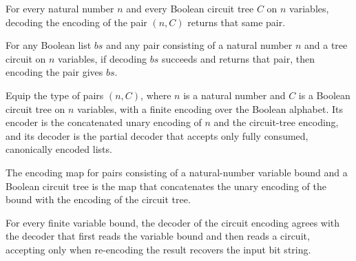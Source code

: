 \begin{theorem}
\label{BoolCircuit.decodeSigma_encodeSigma}
\leanok
{}
For every natural number $n$ and every Boolean circuit tree $C$ on $n$ variables,
decoding the encoding of the pair $(n,C)$ returns that same pair.
\end{theorem}

\begin{theorem}
\label{BoolCircuit.encodeSigma_of_decodeSigma}
\leanok
{}
For any Boolean list $bs$ and any pair consisting of a natural number $n$ and a tree
circuit on $n$ variables, if decoding $bs$ succeeds and returns that pair, then encoding
the pair gives $bs$.
\end{theorem}

\begin{definition}
\label{BoolCircuit.circuitEncoding}
\leanok
{}
Equip the type of pairs $(n,C)$, where $n$ is a natural number and $C$ is a Boolean
circuit tree on $n$ variables, with a finite encoding over the Boolean alphabet. Its
encoder is the concatenated unary encoding of $n$ and the circuit-tree encoding, and its
decoder is the partial decoder that accepts only fully consumed, canonically encoded
lists.
\end{definition}

\begin{theorem}
\label{BoolCircuit.circuitEncoding_encode}
\leanok
{}
The encoding map for pairs consisting of a natural-number variable bound and a Boolean
circuit tree is the map that concatenates the unary encoding of the bound with the
encoding of the circuit tree.
\end{theorem}

\begin{theorem}
\label{BoolCircuit.circuitEncoding_decode}
\leanok
{}
For every finite variable bound, the decoder of the circuit encoding agrees with the
decoder that first reads the variable bound and then reads a circuit, accepting only
when re-encoding the result recovers the input bit string.
\end{theorem}

